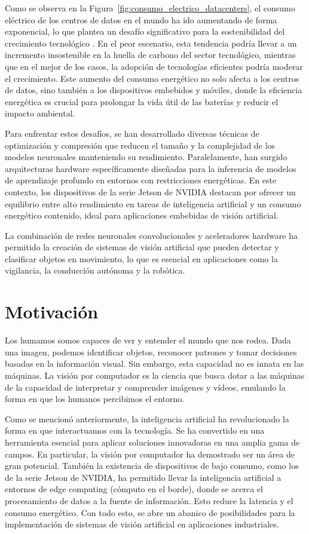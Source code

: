 \documentclass[11pt,spanish,listoffigures,listoftables]{tfgetsinf}
\begin{document}
Como se observa en la Figura~\ref{fig:consumo_electrico_datacenters}, el consumo eléctrico de los centros de datos en el mundo ha ido aumentando de forma exponencial, lo que plantea un desafío significativo para la sostenibilidad del crecimiento tecnológico \cite{challe6010117}. En el peor escenario, esta tendencia podría llevar a un incremento insostenible en la huella de carbono del sector tecnológico, mientras que en el mejor de los casos, la adopción de tecnologías eficientes podría moderar el crecimiento. Este aumento del consumo energético no solo afecta a los centros de datos, sino también a los dispositivos embebidos y móviles, donde la eficiencia energética es crucial para prolongar la vida útil de las baterías y reducir el impacto ambiental.

Para enfrentar estos desafíos, se han desarrollado diversas técnicas de optimización y compresión que reducen el tamaño y la complejidad de los modelos neuronales manteniendo su rendimiento. Paralelamente, han surgido arquitecturas hardware específicamente diseñadas para la inferencia de modelos de aprendizaje profundo en entornos con restricciones energéticas. En este contexto, los dispositivos de la serie Jetson de NVIDIA destacan por ofrecer un equilibrio entre alto rendimiento en tareas de inteligencia artificial y un consumo energético contenido, ideal para aplicaciones embebidas de visión artificial.

La combinación de redes neuronales convolucionales y aceleradores hardware ha permitido la creación de sistemas de visión artificial que pueden detectar y clasificar objetos en movimiento, lo que es esencial en aplicaciones como la vigilancia, la conducción autónoma y la robótica.

\section{Motivaci\'on}

Los humamos somos capaces de ver y entender el mundo que nos rodea. Dada una imagen, podemos identificar objetos, reconocer patrones y tomar decisiones basadas en la información visual. Sin embargo, esta capacidad no es innata en las máquinas. La visión por computador es la ciencia que busca dotar a las máquinas de la capacidad de interpretar y comprender imágenes y vídeos, emulando la forma en que los humanos percibimos el entorno. 

Como se mencionó anteriormente, la inteligencia artificial ha revolucionado la forma en que interactuamos con la tecnología. Se ha convertido en una herramienta esencial para aplicar soluciones innovadoras en una amplia gama de campos. En particular, la visión por computador ha demostrado ser un área de gran potencial. También la existencia de dispositivos de bajo consumo, como los de la serie Jetson de NVIDIA, ha permitido llevar la inteligencia artificial a entornos de edge computing (cómputo en el borde), donde se acerca el procesamiento de datos a la fuente de información. Esto reduce la latencia y el consumo energético. Con todo esto, se abre un abanico de posibilidades para la implementación de sistemas de visión artificial en aplicaciones industriales.
\end{document}
